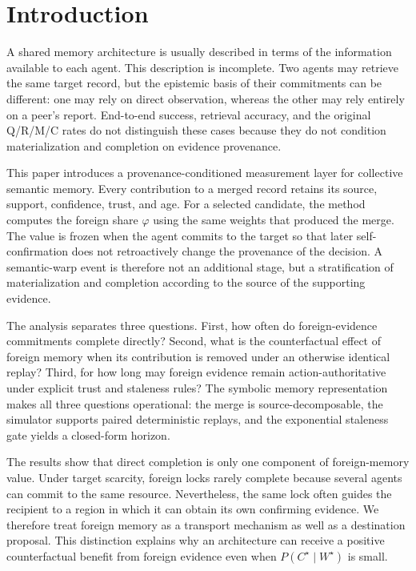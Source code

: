 \documentclass{article}
\begin{document}
\FloatBarrier
\section{Introduction}
\label{p2:sec:intro}

A shared memory architecture is usually described in terms of the
information available to each agent. This description is incomplete.
Two agents may retrieve the same target record, but the epistemic
basis of their commitments can be different: one may rely on direct
observation, whereas the other may rely entirely on a peer's report.
End-to-end success, retrieval accuracy, and the original Q/R/M/C
rates do not distinguish these cases because they do not condition
materialization and completion on evidence provenance.

This paper introduces a provenance-conditioned measurement layer for
collective semantic memory. Every contribution to a merged record
retains its source, support, confidence, trust, and age. For a selected
candidate, the method computes the foreign share $\varphi$ using the
same weights that produced the merge. The value is frozen when the
agent commits to the target so that later self-confirmation does not
retroactively change the provenance of the decision. A semantic-warp
event is therefore not an additional stage, but a stratification of
materialization and completion according to the source of the
supporting evidence.

The analysis separates three questions. First, how often do
foreign-evidence commitments complete directly? Second, what is the
counterfactual effect of foreign memory when its contribution is
removed under an otherwise identical replay? Third, for how long may
foreign evidence remain action-authoritative under explicit trust and
staleness rules? The symbolic memory representation makes all three
questions operational: the merge is source-decomposable, the simulator
supports paired deterministic replays, and the exponential staleness
gate yields a closed-form horizon.

The results show that direct completion is only one component of
foreign-memory value. Under target scarcity, foreign locks rarely
complete because several agents can commit to the same resource.
Nevertheless, the same lock often guides the recipient to a region in
which it can obtain its own confirming evidence. We therefore treat
foreign memory as a transport mechanism as well as a destination
proposal. This distinction explains why an architecture can receive a
positive counterfactual benefit from foreign evidence even when
$P(C^\star\mid W^\star)$ is small.
\end{document}
